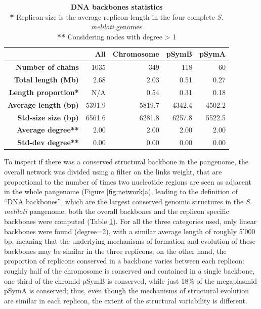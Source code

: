 \begin{table}[htbp]
  \centering
    \begin{tabular}{rrrrr}
    \toprule
          & \textbf{All} & \textbf{Chromosome} & \textbf{pSymB} & \textbf{pSymA} \\
    \midrule
    \textbf{Number of chains} & 1035  & 349   & 118   & 60 \\
    \textbf{Total length (Mb)} & 2.68  & 2.03  & 0.51  & 0.27 \\
    \textbf{Length proportion*} & N/A   & 0.54  & 0.31  & 0.18 \\
    \textbf{Average length (bp)} & 5391.9 & 5819.7 & 4342.4 & 4502.2 \\
    \textbf{Std-size size (bp)} & 6561.6 & 6281.8 & 6257.8 & 5522.5 \\
    \textbf{Average degree**} & 2.00  & 2.00  & 2.00  & 2.00 \\
    \textbf{Std-dev degree**} & 0.00  & 0.00  & 0.00  & 0.00 \\
    \bottomrule
    \end{tabular}%
    \caption{\textbf{DNA backbones statistics}\\
    			\textbf{*} Replicon size is the average replicon length in the four complete \textit{S. meliloti} genomes\\
			\textbf{**} Considering nodes with degree > 1}
	\label{tab:chains}%
\end{table}%
To inspect if there was a conserved structural backbone in the pangenome, the overall network was divided using a filter on the links weight, that are proportional to the number of times two nucleotide regions are seen as adjacent in the whole pangenome (Figure \ref{fig:network}a), leading to the definition of “DNA backbones”, which are the largest conserved genomic structures in the \textit{S. meliloti} pangenome; both the overall backbones and the replicon specific backbones were computed (Table \ref{tab:chains}).  For all the three categories used, only linear backbones were found (degree=2), with a similar average length of roughly 5'000 bp, meaning that the underlying mechanisms of formation and evolution of these backbones may be similar in the three replicons; on the other hand, the proportion of replicons conserved in a backbone varies between each replicon: roughly half of the chromosome is conserved and contained in a single backbone, one third of the chromid pSymB is conserved, while just 18\% of the megaplasmid pSymA is conserved; thus, even though the mechanisms of structural evolution are similar in each replicon, the extent of the structural variability is different.

